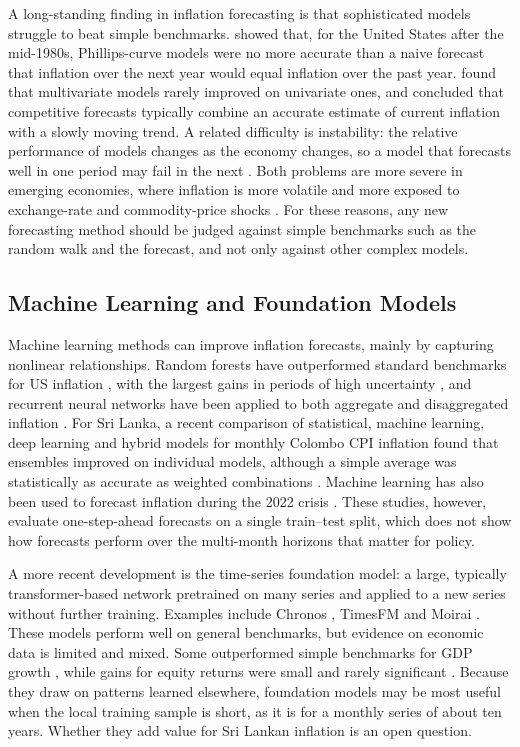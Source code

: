 \documentclass[12pt]{article}
\begin{document}
A long-standing finding in inflation forecasting is that sophisticated models
struggle to beat simple benchmarks. \citet{atkeson2001} showed that, for the
United States after the mid-1980s, Phillips-curve models were no more accurate
than a naive forecast that inflation over the next year would equal inflation
over the past year. \citet{stock2007} found that multivariate models rarely
improved on univariate ones, and \citet{faust2013} concluded that competitive
forecasts typically combine an accurate estimate of current inflation with a
slowly moving trend. A related difficulty is instability: the relative
performance of models changes as the economy changes, so a model that
forecasts well in one period may fail in the next \citep{rossi2013}. Both
problems are more severe in emerging economies, where inflation is more
volatile and more exposed to exchange-rate and commodity-price shocks
\citep{ha2019inflation}. For these reasons, any new forecasting method should
be judged against simple benchmarks such as the random walk and the
\citet{atkeson2001} forecast, and not only against other complex models.

\subsection{Machine Learning and Foundation Models}
\label{sec:lit-ml}

Machine learning methods can improve inflation forecasts, mainly by capturing
nonlinear relationships. Random forests have outperformed standard benchmarks
for US inflation \citep{medeiros2021}, with the largest gains in periods of
high uncertainty \citep{goulet2022}, and recurrent neural networks have been
applied to both aggregate and disaggregated inflation
\citep{almosova2023, barkan2023}. For Sri Lanka, a recent comparison of
statistical, machine learning, deep learning and hybrid models for monthly
Colombo CPI inflation found that ensembles improved on individual models,
although a simple average was statistically as accurate as weighted
combinations \citep{slchapter2025}. Machine learning has also been used to
forecast inflation during the 2022 crisis \citep{raj2024}. These studies,
however, evaluate one-step-ahead forecasts on a single train--test split,
which does not show how forecasts perform over the multi-month horizons that
matter for policy.

A more recent development is the time-series foundation model: a large,
typically transformer-based network pretrained on many series and applied to
a new series without further training. Examples include Chronos
\citep{ansari2024chronos, ansari2025chronos2}, TimesFM \citep{das2024timesfm}
and Moirai \citep{woo2024moirai}. These models perform well on general
benchmarks, but evidence on economic data is limited and mixed. Some
outperformed simple benchmarks for GDP growth \citep{tsfmgdp2025}, while gains
for equity returns were small and rarely significant \citep{noguer2026}.
Because they draw on patterns learned elsewhere, foundation models may be most
useful when the local training sample is short, as it is for a monthly series
of about ten years. Whether they add value for Sri Lankan inflation is an open
question.
\end{document}
